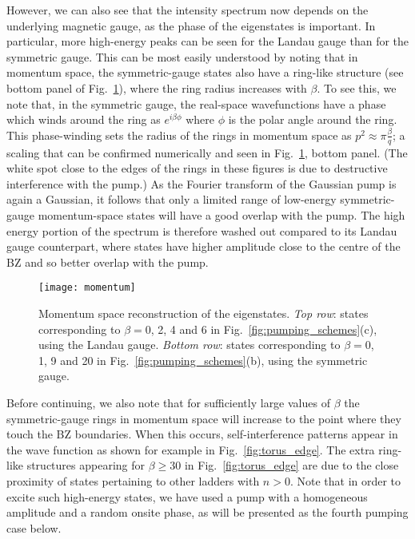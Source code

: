 \documentclass[twocolumn, 10pt, aps, superscriptaddress, floatfix, showpacs, pra, citeautoscript]{revtex4-1}
\begin{document}
However, we can also see that the intensity spectrum now depends on the underlying magnetic gauge, as the phase of the eigenstates is important. In particular, more high-energy peaks can be seen for the Landau gauge than for the symmetric gauge. This can be most easily understood by noting that in momentum space, the symmetric-gauge states also have a ring-like structure (see bottom panel of Fig.~\ref{fig:hom_mom_sp}), where the ring radius increases with $\beta$. To see this, we note that, in the symmetric gauge, the real-space wavefunctions have a phase which
winds around the ring as $e^{i\beta \phi}$ where $\phi$ is the polar angle around the ring. This phase-winding sets the radius of the rings in momentum space as $p^2 \approx \pi \frac{\beta}{q}$; a scaling that can be confirmed numerically and seen in Fig.~\ref{fig:hom_mom_sp}, bottom panel. (The white spot close to the edges of the rings in these figures is due to destructive interference with the pump.)  As the Fourier transform of the Gaussian pump is again a Gaussian, it follows that only a limited range of low-energy symmetric-gauge momentum-space states will have a good overlap with the pump. The high energy portion of the spectrum is therefore washed out compared to its Landau gauge
counterpart, where states have higher amplitude close to the centre of the BZ and so better overlap with the pump. 

\begin{figure}[tb]\centering
  \texttt{[image: momentum]} %
  \caption{Momentum space reconstruction of the
    eigenstates. \emph{Top row}: states corresponding to $\beta=0$, 2,
    4 and 6 in Fig.~\ref{fig:pumping_schemes}(c), using the
    Landau gauge.  \emph{Bottom row}: states corresponding to
    $\beta=0$, 1, 9 and 20 in Fig.~\ref{fig:pumping_schemes}(b), using the symmetric gauge.}
  \label{fig:hom_mom_sp}
\end{figure}

Before continuing, we also note that for sufficiently large values of $\beta$ the symmetric-gauge rings in momentum space will increase to the point where they touch the BZ boundaries. When this occurs, self-interference patterns appear in the wave function as shown for example in Fig.~\ref{fig:torus_edge}. The extra ring-like structures appearing for $\beta \geq 30$ in Fig.~\ref{fig:torus_edge} are due to the close proximity of states pertaining to other ladders with
$n >0$. Note that in order to excite such high-energy states, we have used a pump with a homogeneous amplitude and a random onsite phase, as will be presented as the fourth pumping case below. 
\end{document}
